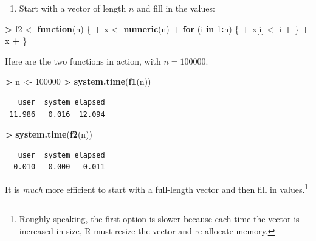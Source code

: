 \documentclass[]{krantz}
\makeatletter
\newenvironment{Shaded}{\begin{snugshade}}{\end{snugshade}}
\newcommand{\ControlFlowTok}[1]{\textcolor[rgb]{0.27,0.27,0.27}{\textbf{#1}}}
\newcommand{\DecValTok}[1]{\textcolor[rgb]{0.06,0.06,0.06}{#1}}
\newcommand{\KeywordTok}[1]{\textcolor[rgb]{0.27,0.27,0.27}{\textbf{#1}}}
\newcommand{\NormalTok}[1]{#1}
\newcommand{\OperatorTok}[1]{\textcolor[rgb]{0.43,0.43,0.43}{\textbf{#1}}}
\newcommand{\StringTok}[1]{\textcolor[rgb]{0.5,0.5,0.5}{#1}}
\providecommand{\tightlist}{%
  \setlength{\itemsep}{0pt}\setlength{\parskip}{0pt}}
\newenvironment{kframe}{%
\medskip{}
\setlength{\fboxsep}{.8em}
 \def\at@end@of@kframe{}%
 \ifinner\ifhmode%
  \def\at@end@of@kframe{\end{minipage}}%
  \begin{minipage}{\columnwidth}%
 \fi\fi%
 \def\FrameCommand##1{\hskip\@totalleftmargin \hskip-\fboxsep
 \colorbox{shadecolor}{##1}\hskip-\fboxsep
     \hskip-\linewidth \hskip-\@totalleftmargin \hskip\columnwidth}%
 \MakeFramed {\advance\hsize-\width
   \@totalleftmargin\z@ \linewidth\hsize
   \@setminipage}}%
 {\par\unskip\endMakeFramed%
 \at@end@of@kframe}
\renewenvironment{Shaded}{\begin{kframe}}{\end{kframe}}
\makeatother
\begin{document}
\begin{enumerate}
\def\labelenumi{\arabic{enumi}.}
\setcounter{enumi}{1}
\tightlist
\item
  Start with a vector of length \(n\) and fill in the values:
\end{enumerate}

\begin{Shaded}
\begin{Highlighting}[]
\OperatorTok{>}\StringTok{ }\NormalTok{f2 <-}\StringTok{ }\ControlFlowTok{function}\NormalTok{(n) \{}
\OperatorTok{+}\StringTok{   }\NormalTok{x <-}\StringTok{ }\KeywordTok{numeric}\NormalTok{(n)}
\OperatorTok{+}\StringTok{   }\ControlFlowTok{for}\NormalTok{ (i }\ControlFlowTok{in} \DecValTok{1}\OperatorTok{:}\NormalTok{n) \{}
\OperatorTok{+}\StringTok{     }\NormalTok{x[i] <-}\StringTok{ }\NormalTok{i}
\OperatorTok{+}\StringTok{   }\NormalTok{\}}
\OperatorTok{+}\StringTok{   }\NormalTok{x}
\OperatorTok{+}\StringTok{ }\NormalTok{\}}
\end{Highlighting}
\end{Shaded}

Here are the two functions in action, with \(n = 100000\).

\begin{Shaded}
\begin{Highlighting}[]
\OperatorTok{>}\StringTok{ }\NormalTok{n <-}\StringTok{ }\DecValTok{100000}
\OperatorTok{>}\StringTok{ }\KeywordTok{system.time}\NormalTok{(}\KeywordTok{f1}\NormalTok{(n))}
\end{Highlighting}
\end{Shaded}

\begin{verbatim}
   user  system elapsed 
 11.986   0.016  12.094 
\end{verbatim}

\begin{Shaded}
\begin{Highlighting}[]
\OperatorTok{>}\StringTok{ }\KeywordTok{system.time}\NormalTok{(}\KeywordTok{f2}\NormalTok{(n))}
\end{Highlighting}
\end{Shaded}

\begin{verbatim}
   user  system elapsed 
  0.010   0.000   0.011 
\end{verbatim}

It is \emph{much} more efficient to start with a full-length vector and then fill in values.\footnote{Roughly speaking, the first option is slower because each time the vector is increased in size, R must resize the vector and re-allocate memory.}
\end{document}
